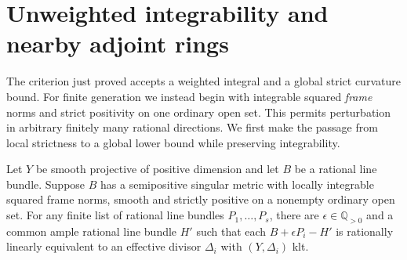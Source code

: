 \section{Unweighted integrability and nearby adjoint rings}
\label{sec:correction-ring}

The criterion just proved accepts a weighted integral and a global
strict curvature bound.  For finite generation we instead begin with
integrable squared \emph{frame} norms and strict positivity on one
ordinary open set.  This permits perturbation in arbitrary finitely
many rational directions.  We first make the passage from local
strictness to a global lower bound while preserving integrability.

\begin{lemma}\label{lem:integrable-neighborhood}
Let $Y$ be smooth projective of positive dimension and let $B$ be a
rational line bundle.  Suppose $B$ has a semipositive singular metric
with locally integrable squared frame norms, smooth and strictly
positive on a nonempty ordinary open set.
For any finite list of rational line bundles $P_1,\ldots,P_s$, there
are $\epsilon\in\mathbb Q_{>0}$ and a common ample rational line
bundle $H'$ such that each $B+\epsilon P_i-H'$ is rationally linearly
equivalent to an effective divisor $\Delta_i$ with $(Y,\Delta_i)$ klt.
\end{lemma}

